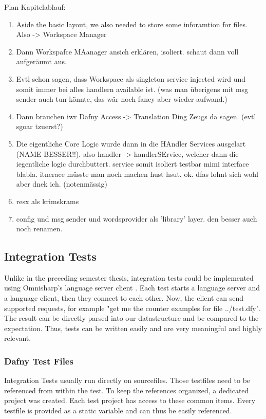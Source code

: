 Plan Kapitelablauf:
\begin{enumerate}
    \item Aside the basic layout, we also needed to store some inforamtion for files. Also -> Workspace Manager
    \item Dann Workspafce MAanager ansich erklären, isoliert. schaut dann voll aufgeräumt aus.
    \item Evtl schon sagen, dass Workspace als singleton service injected wird und somit immer bei alles handlern available ist. (was man überigens mit msg sender auch tun könnte, das wär noch fancy aber wieder aufwand.)
    \item Dann brauchen iwr Dafny Access -> Translation Ding Zeugs da sagen. (evtl sgoar tzuerst?)
    \item Die eigentliche Core Logic wurde dann in die HAndler Services ausgelart (NAME BESSER!!). also handler -> handlerSErvice, welcher dann die iegentliche logic durchbuttert. service somit isoliert testbar mimi interface blabla. itnerace müsste man noch machen hust hsut. ok. dfas lohnt sich wohl aber dnek ich. (notenmässig)
    \item resx als krimskrams
    \item config und msg sender und wordsprovider als 'library' layer. den besser auch noch renamen.
\end{enumerate}

\subsection{Integration Tests}
\label{chapter:designTests}
Unlike in the preceding semester thesis, integration tests could be implemented using Omnisharp's language server client \cite{omnisharpClient}. Each test starts a language server and a language client, then they connect to each other. Now, the client can send supported requests, for example "get me the counter examples for file ../test.dfy". The result can be directly parsed into our  datastructure and be compared to the expectation. Thus, tests can be written easily and are very meaningful and highly relevant.

\subsubsection{Dafny Test Files}
Integration Tests usually run directly on  sourcefiles. Those testfiles need to be referenced from within the test. To keep the references organized, a dedicated project  was created. Each test project has access to these common items. Every testfile is provided as a static variable and can thus be easily referenced.


